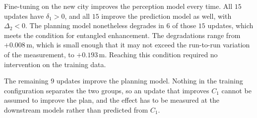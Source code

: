 \documentclass[conference]{IEEEtran}
\begin{document}
Fine-tuning on the new city improves the perception model every time. All $15$ updates
have $\delta_1 > 0$, and all $15$ improve the prediction model as well, with
$\Delta_2 < 0$. The planning model nonetheless degrades in $6$ of those $15$ updates,
which meets the condition for entangled enhancement. The degradations range from $+0.008$\,m, which is small
enough that it may not exceed the run-to-run variation of the measurement, to $+0.193$\,m. Reaching
this condition required no intervention on the training data.

The remaining $9$ updates improve the planning model. Nothing in the training
configuration separates the two groups, so an update that improves $C_1$
cannot be assumed to improve the plan, and the effect has to be measured at the
downstream models rather than predicted from $C_1$.
\end{document}
